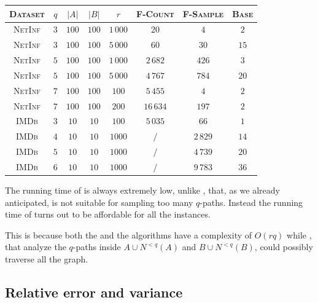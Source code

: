 \begin{table}[ht]
	\centering
	\begin{tabular}{|c|c|c|c|c|c|c|c|}
		\hline
		\textsc{Dataset} & $q$ & $|A|$ & $|B|$ & $r$      & \textsc{F-Count} & \textsc{F-Sample} & \textsc{Base} \\ \hline \hline
		\textsc{NetInf}  & $3$ & $100$ & $100$ & $1\,000$ & $20$             & $4$               & $2$           \\ \hline
		\textsc{NetInf}  & $3$ & $100$ & $100$ & $5\,000$ & $60$             & $30$              & $15$          \\ \hline
		\textsc{NetInf}  & $5$ & $100$ & $100$ & $1\,000$ & $2\,682$         & $426$             & $3$           \\ \hline
		\textsc{NetInf}  & $5$ & $100$ & $100$ & $5\,000$ & $4\,767$         & $784$             & $20$          \\ \hline
		\textsc{NetInf}  & $7$ & $100$ & $100$ & $100$    & $5\,455$         & $4$               & $2$           \\ \hline
		\textsc{NetInf}  & $7$ & $100$ & $100$ & $200$    & $16\,634$        & $197$             & $2$           \\ \hline \hline
		\textsc{IMDb}    & $3$ & $10$  & $10$  & $100$    & $5\,035$         & $66$              & $1$           \\ \hline
		\textsc{IMDb}    & $4$ & $10$  & $10$  & $1000$   & $/$              & $2\,829$          & $14$          \\ \hline
		\textsc{IMDb}    & $5$ & $10$  & $10$  & $1000$   & $/$              & $4\,739$          & $20$          \\ \hline
		\textsc{IMDb}    & $6$ & $10$  & $10$  & $1000$   & $/$              & $9\,783$          & $36$          \\ \hline
	\end{tabular}
\end{table}

The running time of \base is always extremely low, 
unlike \fcount, that, as we already anticipated, is not suitable for sampling too many $q$-paths.
Instead the running time of \fsamp turns out to be affordable for all the instances. 

This is because both the \fsamp and the \base algorithms have a complexity of $O(rq)$ while 
\fcount, that analyze the $q$-paths inside $A \cup N^{<q}(A)$ and $B \cup N^{<q}(B)$, could possibly traverse all the graph.

\subsection*{Relative error and variance}

